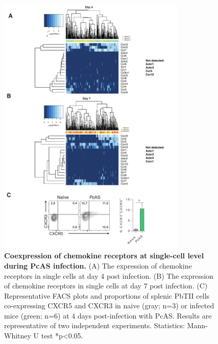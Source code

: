 \begin{figure}
    \centering
    \includegraphics[width=0.8\textwidth]{"Fig S18 rev3"}
    \caption[Coexpression of chemokine receptors at single-cell level during PcAS infection]{\textbf{Coexpression of chemokine receptors at single-cell level during PcAS infection.} (A) The expression of chemokine receptors in single cells at day 4 post infection. (B) The expression of chemokine receptors in single cells at day 7 post infection. (C) Representative FACS plots and proportions of splenic PbTII cells co-expressing CXCR5 and CXCR3 in naive (gray; n=3) or infected mice (green; n=6) at 4 days post-infection with PcAS. Results are representative of two independent experiments. Statistics: Mann-Whitney U test *p<0.05.}
    \label{fig:ms18}
\end{figure}

